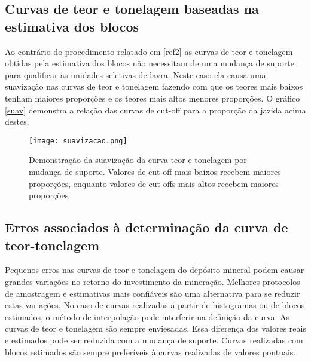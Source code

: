 \subsection{Curvas de teor e tonelagem baseadas na estimativa dos blocos}

Ao contrário do procedimento relatado em \eqref{ref2} as curvas de teor e tonelagem obtidas pela estimativa dos blocos não necessitam de uma mudança de suporte para qualificar as unidades seletivas de lavra. Neste caso ela causa uma suavização nas curvas de teor e tonelagem fazendo com que os teores mais baixos tenham maiores proporções e os teores mais altos menores proporções. O gráfico \eqref{suav} demonstra a relação das curvas de cut-off para a proporção da jazida acima destes. 


\begin{figure}[H]
	\centering
	\texttt{[image: suavizacao.png]}	
	\caption{Demonstração da suavização da curva teor e tonelagem por mudança de suporte. Valores de cut-off mais baixos recebem maiores proporções, enquanto valores de cut-offs mais altos recebem maiores proporções}
	\label{suav}
\end{figure} 
 
 \subsection{Erros associados à determinação da curva de teor-tonelagem}
 
 Pequenos erros nas curvas de teor e tonelagem do depósito mineral podem causar grandes variações no retorno do investimento da mineração. Melhores protocolos de amostragem e estimativas mais confiáveis são uma alternativa para se reduzir estas variações. No caso de curvas realizadas a partir de histogramas ou de blocos estimados, o método de interpolação pode interferir na definição da curva. As curvas de teor e tonelagem são sempre enviesadas. Essa diferença dos valores reais e estimados pode ser reduzida com a mudança de suporte. Curvas realizadas com blocos estimados são sempre preferíveis à curvas realizadas de valores pontuais. 
  
